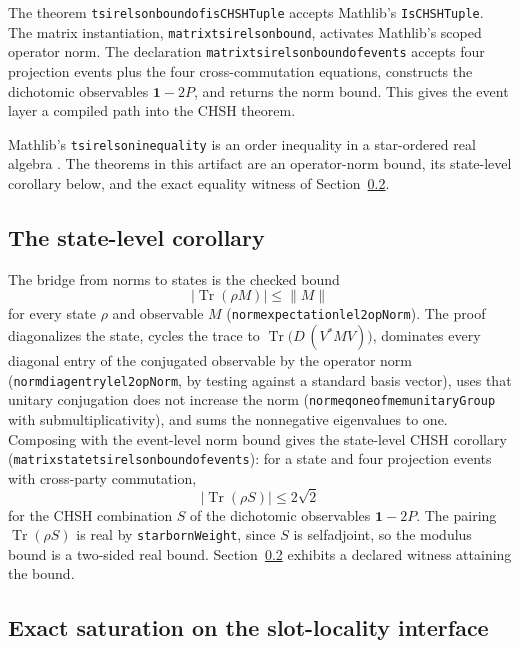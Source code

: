 \documentclass[11pt]{article}
\renewcommand{\_}{\textunderscore\allowbreak}
\theoremstyle{remark}
\newcommand{\Tr}{\operatorname{Tr}}
\newcommand{\one}{\mathbf 1}
\newcommand{\norm}[1]{\lVert #1\rVert}
\begin{document}
The theorem \texttt{tsirelson\_bound\_of\_isCHSHTuple} accepts Mathlib's
\texttt{IsCHSHTuple}. The matrix instantiation,
\texttt{matrix\_tsirelson\_bound}, activates Mathlib's scoped operator
norm. The declaration \texttt{matrix\_tsirelson\_bound\_of\_events} accepts four
projection events plus the four cross-commutation equations, constructs the
dichotomic observables $\one-2P$, and returns the norm bound. This gives the
event layer a compiled path into the CHSH theorem.

Mathlib's \texttt{tsirelson\_inequality} is an order inequality in a
star-ordered real algebra \cite{mathlibCHSH2026}. The theorems in this
artifact are an operator-norm bound, its state-level corollary below, and
the exact equality witness of Section~\ref{subsec:saturation}.

\subsection{The state-level corollary}
\label{subsec:statechsh}

The bridge from norms to states is the checked bound
\[
 \lvert\Tr(\rho M)\rvert\le\norm{M}
\]
for every state $\rho$ and observable $M$
(\texttt{norm\_expectation\_le\_l2\_opNorm}). The proof diagonalizes the
state, cycles the trace to $\Tr\!\bigl(D\,(V^*MV)\bigr)$, dominates every
diagonal entry of the conjugated observable by the operator norm
(\texttt{norm\_diag\_entry\_le\_l2\_opNorm}, by testing against a standard
basis vector), uses that unitary conjugation does not increase the norm
(\texttt{norm\_eq\_one\_of\_mem\_unitaryGroup} with submultiplicativity), and
sums the nonnegative eigenvalues to one. Composing with the event-level norm
bound gives the state-level CHSH corollary
(\texttt{matrix\_state\_tsirelson\_bound\_of\_events}): for a state and four
projection events with cross-party commutation,
\[
 \bigl\lvert\Tr(\rho S)\bigr\rvert\le2\sqrt2
\]
for the CHSH combination $S$ of the dichotomic observables $\one-2P$. The
pairing $\Tr(\rho S)$ is real by \texttt{star\_bornWeight}, since $S$ is
selfadjoint, so the modulus bound is a two-sided real bound.
Section~\ref{subsec:saturation} exhibits a declared witness attaining the
bound.

\subsection{Exact saturation on the slot-locality interface}
\label{subsec:saturation}
\end{document}
